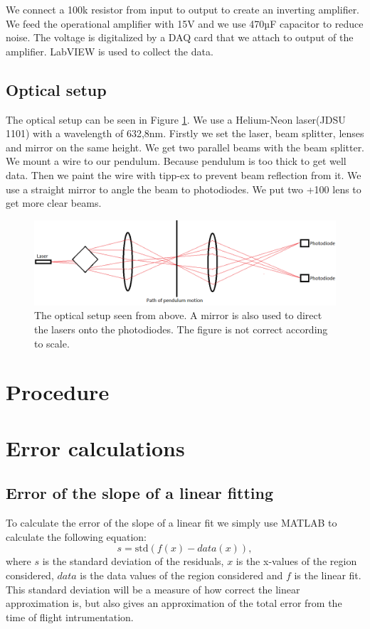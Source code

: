 \documentclass[11pt, a4paper]{article}
\begin{document}
We connect a 100k resistor from input to output to create an inverting amplifier. 
We feed the operational amplifier with 15V and we use 470µF capacitor to reduce 
noise. The voltage is digitalized by a DAQ card that we attach to output of the 
amplifier. LabVIEW is used to collect the data.

\subsection{Optical setup}
\label{s:Optical setup}
The optical setup can be seen in Figure \ref{f:opticalsetup}. We use a Helium-Neon 
laser(JDSU 1101) with a wavelength of 632,8nm. Firstly we set the laser, beam 
splitter, lenses and mirror on the same height. We get two parallel beams with the 
beam splitter. 
We mount a wire to our pendulum. Because pendulum is too thick to get well data. 
Then we paint the wire with tipp-ex to prevent beam reflection from it. We use a 
straight mirror to angle the beam to photodiodes. We put two +100 lens to get more 
clear beams.

\begin{figure}[h]
	\centering
	\includegraphics[scale=0.4]{opticalsetup2}
	\caption{The optical setup seen from above. A mirror is also used to direct the 
  lasers onto the photodiodes. The figure is not correct according to scale.}
	\label{f:opticalsetup}
\end{figure}

\section{Procedure}

\section{Error calculations}

\subsection{Error of the slope of a linear fitting}
To calculate the error of the slope of a linear fit we simply use MATLAB to 
calculate the following equation:
\begin{equation}
	s = \text{std}(f(x)-data(x)),
	\label{e:std}
\end{equation}
where $s$ is the standard deviation of the residuals, $x$ is the x-values of the 
region considered, 
$data$ is the data values of the region considered and $f$ is the linear fit.
This standard deviation will be a measure of how correct the linear approximation is, 
but also gives an approximation of the total error from the time of flight 
intrumentation.
\end{document}
